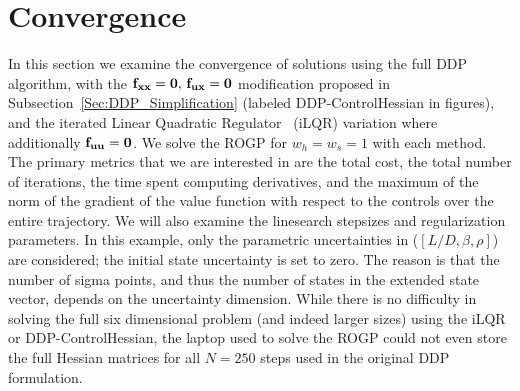 \section{Convergence}
In this section we examine the convergence of solutions using the full DDP algorithm, with the $\mathbf{f}_{\mathbf{x}\mathbf{x}}=\mathbf{0},\, \mathbf{f}_{\mathbf{u}\mathbf{x}}=\mathbf{0}$ modification proposed in Subsection~\ref{Sec:DDP_Simplification} (labeled DDP-ControlHessian in figures), and the iterated Linear Quadratic Regulator~\cite{iLQG} (iLQR) variation where additionally $\mathbf{f}_{\mathbf{u}\mathbf{u}}=\mathbf{0}$. We solve the ROGP for $w_h=w_s=1$ with each method. The primary metrics that we are interested in are the total cost, the total number of iterations, the time spent computing derivatives, and the maximum of the norm of the gradient of the value function with respect to the controls over the entire trajectory. We will also examine the linesearch stepsizes and regularization parameters. In this example, only the parametric uncertainties in ($[L/D,\beta,\rho]$) are considered; the initial state uncertainty is set to zero. The reason is that the number of sigma points, and thus the number of states in the extended state vector, depends on the uncertainty dimension. While there is no difficulty in solving the full six dimensional problem (and indeed larger sizes) using the iLQR or DDP-ControlHessian, the laptop used to solve the ROGP could not even store the full Hessian matrices for all $N=250$ steps used in the original DDP formulation.


